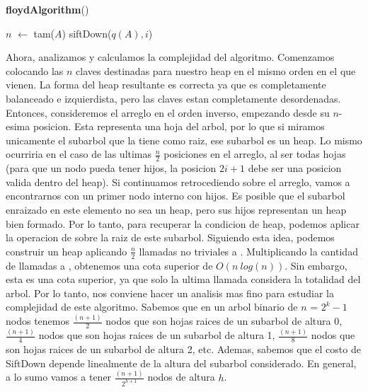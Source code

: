 \documentclass[10pt,a4paper]{article}
\begin{document}
\begin{algorithm}[H]{\textbf{floydAlgorithm}()}
	\begin{algorithmic}[1]
		\State $n$ $\gets$ tam($A$)                               
		\State siftDown($q(A),i$)                                    
		\EndFor
		\medskip
	\end{algorithmic}
\end{algorithm}

Ahora, analizamos y calculamos la complejidad del algoritmo.
\newline
\newline
Comenzamos colocando las $n$ claves destinadas para nuestro heap en el mismo orden en el que
vienen. La forma del heap resultante es correcta ya que es completamente balanceado e izquierdista, pero las claves estan completamente desordenadas. 
\newline
\newline
Entonces, consideremos el arreglo en el orden inverso, empezando desde su $n$-esima posicion. Esta representa una hoja del arbol, por lo que si miramos unicamente el subarbol que la tiene como raiz, ese subarbol es un heap. Lo mismo ocurriria en el caso de las ultimas $\displaystyle \frac{n}{2}$ posiciones en el arreglo, al ser todas hojas (para que un nodo pueda tener hijos, la posicion $2i + 1$ debe ser una posicion valida dentro del heap). Si continuamos retrocediendo sobre el arreglo, vamos a encontrarnos con un primer nodo interno con hijos. Es posible que el subarbol enraizado en este elemento no sea un heap, pero sus hijos representan un heap bien formado. Por lo tanto, para recuperar la condicion de heap, podemos aplicar la operacion de  sobre la raiz de este subarbol. Siguiendo esta idea, podemos construir un heap aplicando $\displaystyle \frac{n}{2}$ llamadas no triviales a .
\newline
\newline
Multiplicando la cantidad de llamadas a , obtenemos una cota superior de $O(n~log(n))$. Sin embargo, esta es una cota superior, ya que solo la ultima llamada considera la totalidad del arbol. Por lo tanto, nos conviene hacer un analisis mas fino para estudiar la complejidad de este algoritmo.
\newline
\newline
Sabemos que en un arbol binario de $n$ = $2^{k} - 1$ nodos tenemos $\displaystyle \frac{(n+1)}{2}$ nodos que son hojas raices de un subarbol de altura 0, $\displaystyle \frac{(n+1)}{4}$ nodos que son hojas raices de un subarbol de altura 1, $\displaystyle \frac{(n+1)}{8}$ nodos que son hojas raices de un subarbol de altura 2, etc. Ademas, sabemos que el costo de SiftDown depende linealmente de la altura del subarbol considerado. En general, a lo sumo vamos a tener $\displaystyle \frac{(n+1)}{2^{h+1}}$ nodos de altura $h$.
\end{document}
